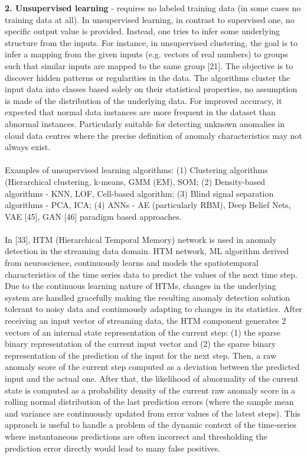 \documentclass[]{usiinfprospectus}
\begin{document}
%
\textbf {2. Unsupervised learning} - requires no labeled training data (in some cases no training data at all). In unsupervised learning, in contrast to supervised one, no specific output value is provided. Instead, one tries to infer some underlying structure from the inputs. For instance, in unsupervised clustering, the goal is to infer a mapping from the given inputs (e.g. vectors of real numbers) to groups such that similar inputs are mapped to the same group [21]. The objective is to discover hidden patterns or regularities in the data. The algorithms cluster the input data into classes based solely on their statistical properties, no assumption is made of the distribution of the underlying data. For improved accuracy, it expected that normal data instances are more frequent in the dataset than abnormal instances. Particularly suitable for detecting unknown anomalies in cloud data centres where the precise definition of anomaly characteristics may not always exist.\\\\
%
Examples of unsupervised learning algorithms: (1) Clustering algorithms (Hierarchical clustering, k-means, GMM (EM), SOM; (2) Density-based algorithms - KNN, LOF, Cell-based algorithm; (3) Blind signal separation algorithms - PCA, ICA; (4) ANNs - AE (particularly RBM), Deep Belief Nets, VAE [45], GAN [46] paradigm based approaches.\\\\
In [33], HTM (Hierarchical Temporal Memory) network is used in anomaly detection in the streaming data domain. HTM network, ML algorithm derived from neuroscience, continuously learns and models the spatiotemporal characteristics of the time series data to predict the values of the next time step. Due to the continuous learning nature of HTMs, changes in the underlying system are handled gracefully making the resulting anomaly detection solution tolerant to noisy data and continuously adapting to changes in its statistics. After receiving an input vector of streaming data, the HTM component generates 2 vectors of an internal state representation of the current step: (1) the sparse binary representation of the current input vector and (2) the sparse binary representation of the prediction of the input for the next step. Then, a raw anomaly score of the current step computed as a deviation between the predicted input and the actual one. After that, the likelihood of abnormality of the current state is computed as a probability density of the current raw anomaly score in a rolling normal distribution of the last prediction errors (where the sample mean and variance are continuously updated from error values of the latest steps). This approach is useful to handle a problem of the dynamic context of the time-series where instantaneous predictions are often incorrect and thresholding the prediction error directly would lead to many false positives.\\\\
\end{document}
